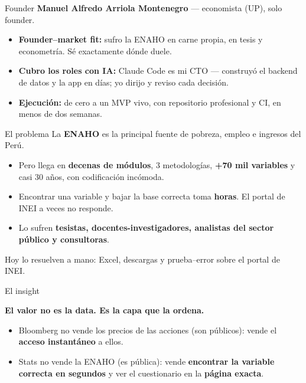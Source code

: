 \documentclass[aspectratio=169,11pt]{beamer}
\newcommand{\impacto}[1]{{\Large\color{AzulStats}\textbf{#1}}}
\begin{document}
\begin{frame}{Founder}
  \textbf{Manuel Alfredo Arriola Montenegro} --- economista (UP), solo founder.\par
  \vspace{0.5cm}
  \begin{itemize}
    \item \textbf{Founder--market fit:} sufro la ENAHO en carne propia, en tesis y econometría.
      Sé exactamente dónde duele.
    \item \textbf{Cubro los roles con IA:} \textcolor{AzulClaro}{Claude Code es mi CTO} --- construyó
      el backend de datos y la app en días; yo dirijo y reviso cada decisión.
    \item \textbf{Ejecución:} de cero a un MVP vivo, con repositorio profesional y CI, en menos de
      dos semanas.
  \end{itemize}
\end{frame}

\begin{frame}{El problema}
  La \textbf{ENAHO} es la principal fuente de pobreza, empleo e ingresos del Perú.\par
  \vspace{0.35cm}
  \begin{itemize}
    \item Pero llega en \textbf{decenas de módulos}, 3 metodologías, \textbf{+70 mil variables} y
      casi 30 años, con codificación incómoda.
    \item Encontrar una variable y bajar la base correcta toma \textbf{horas}. El portal de INEI a
      veces no responde.
    \item Lo sufren \textbf{tesistas, docentes-investigadores, analistas del sector público y
      consultoras}.
  \end{itemize}
  \vspace{0.3cm}
  \begin{block}{}
    Hoy lo resuelven a mano: Excel, descargas y prueba--error sobre el portal de INEI.
  \end{block}
\end{frame}

\begin{frame}{El insight}
  \vspace{0.4cm}
  \begin{center}
    \impacto{El valor no es la data. Es la capa que la ordena.}
  \end{center}
  \vspace{0.6cm}
  \begin{itemize}
    \item Bloomberg no vende los precios de las acciones (son públicos): vende el
      \textbf{acceso instantáneo} a ellos.
    \item Stats no vende la ENAHO (es pública): vende \textbf{encontrar la variable correcta en
      segundos} y ver el cuestionario en la \textbf{página exacta}.
  \end{itemize}
\end{frame}
\end{document}
